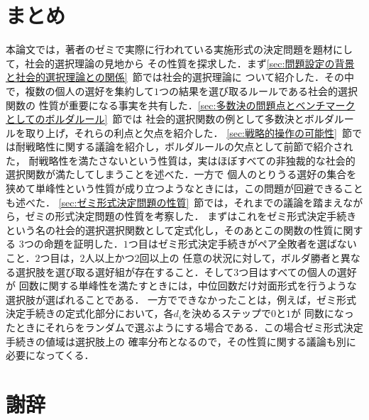 \documentclass[dvipdfmx]{jsarticle}
\begin{document}
\section{まとめ}
本論文では，著者のゼミで実際に行われている実施形式の決定問題を題材にして，社会的選択理論の見地から
その性質を探求した．まず\ref{sec:問題設定の背景と社会的選択理論との関係}~節では社会的選択理論に
ついて紹介した．その中で，複数の個人の選好を集約して$1$つの結果を選び取るルールである社会的選択関数の
性質が重要になる事実を共有した．\ref{sec:多数決の問題点とベンチマークとしてのボルダルール}~節では
社会的選択関数の例として多数決とボルダルールを取り上げ，それらの利点と欠点を紹介した．
\ref{sec:戦略的操作の可能性}~節では耐戦略性に関する議論を紹介し，ボルダルールの欠点として前節で紹介された，
耐戦略性を満たさないという性質は，実はほぼすべての非独裁的な社会的選択関数が満たしてしまうことを述べた．一方で
個人のとりうる選好の集合を狭めて単峰性という性質が成り立つようなときには，この問題が回避できることも述べた．
\ref{sec:ゼミ形式決定問題の性質}~節では，それまでの議論を踏まえながら，ゼミの形式決定問題の性質を考察した．
まずはこれをゼミ形式決定手続きという名の社会的選択選択関数として定式化し，そのあとこの関数の性質に関する
$3$つの命題を証明した．$1$つ目はゼミ形式決定手続きがペア全敗者を選ばないこと．$2$つ目は，$2$人以上かつ$2$回以上の
任意の状況に対して，ボルダ勝者と異なる選択肢を選び取る選好組が存在すること．そして$3$つ目はすべての個人の選好が
回数に関する単峰性を満たすときには，中位回数だけ対面形式を行うような選択肢が選ばれることである．
一方でできなかったことは，例えば，ゼミ形式決定手続きの定式化部分において，各$d_i$を決めるステップで$0$と$1$が
同数になったときにそれらをランダムで選ぶようにする場合である．この場合ゼミ形式決定手続きの値域は選択肢上の
確率分布となるので，その性質に関する議論も別に必要になってくる．

\section*{謝辞}
\end{document}
